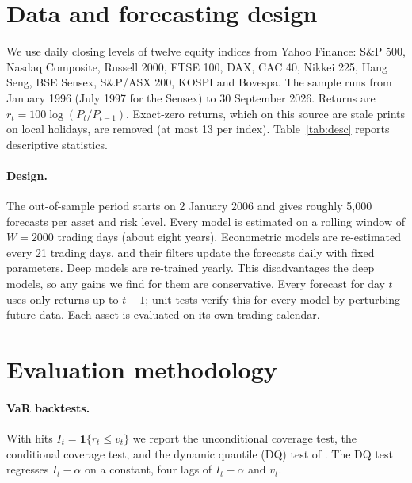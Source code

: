 \documentclass[11pt]{article}
\theoremstyle{remark}
\newcommand{\1}{\mathbf{1}}
\begin{document}
\section{Data and forecasting design}\label{sec:data}
We use daily closing levels of twelve equity indices from Yahoo Finance: S\&P 500, Nasdaq Composite, Russell 2000, FTSE 100, DAX, CAC 40, Nikkei 225, Hang Seng, BSE Sensex, S\&P/ASX 200, KOSPI and Bovespa. The sample runs from January 1996 (July 1997 for the Sensex) to 30 September 2026. Returns are $r_t=100\log(P_t/P_{t-1})$. Exact-zero returns, which on this source are stale prints on local holidays, are removed (at most 13 per index). Table~\ref{tab:desc} reports descriptive statistics.



\paragraph{Design.} The out-of-sample period starts on 2 January 2006 and gives roughly 5{,}000 forecasts per asset and risk level. Every model is estimated on a rolling window of $W=2000$ trading days (about eight years). Econometric models are re-estimated every 21 trading days, and their filters update the forecasts daily with fixed parameters. Deep models are re-trained yearly. This disadvantages the deep models, so any gains we find for them are conservative. Every forecast for day $t$ uses only returns up to $t-1$; unit tests verify this for every model by perturbing future data. Each asset is evaluated on its own trading calendar.

\section{Evaluation methodology}\label{sec:eval}
\paragraph{VaR backtests.} With hits $I_t=\1\{r_t\le v_t\}$ we report the \citet{kupiec1995techniques} unconditional coverage test, the \citet{christoffersen1998evaluating} conditional coverage test, and the dynamic quantile (DQ) test of \citet{engle2004caviar}. The DQ test regresses $I_t-\alpha$ on a constant, four lags of $I_t-\alpha$ and $v_t$.
\end{document}
